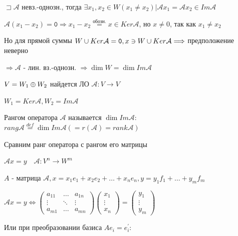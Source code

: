 \documentclass[12pt]{article}
\begin{document}
    $\sqsupset \mathcal{A}$ невз.-однозн., тогда $\displaystyle \exists x_1, x_2 \in W (x_1 \neq x_2) | \mathcal{A}x_1 = \mathcal{A}x_2 \in Im \mathcal{A}$

    $\displaystyle \mathcal{A}(x_1 - x_2) = \texttt{0} \Longrightarrow x_1 - x_2 \stackrel{\text{обозн.}}{=} x \in Ker \mathcal{A}$, но $x \neq 0$, так как $\displaystyle x_1 \neq x_2$

    Но для прямой суммы $W \cup Ker \mathcal{A} = \texttt{0}, x \ni W \cup Ker \mathcal{A} \Longrightarrow$ предположение неверно

    $\Longrightarrow \mathcal{A}$ - лин. вз.-однозн. $\Longrightarrow \dim W = \dim Im \mathcal{A}$

    $\displaystyle V = W_1 \oplus W_2$ найдется ЛО $\mathcal{A} : V \rightarrow V$

    $\displaystyle W_1 = Ker \mathcal{A}, W_2 = Im \mathcal{A}$

    \Def Рангом оператора $\mathcal{A}$ называется $\dim Im \mathcal{A}$: $rang \mathcal{A} \stackrel{def}{=} \dim Im \mathcal{A} (= r(\mathcal{A}) = rank \mathcal{A})$

    \Nota Сравним ранг оператора с рангом его матрицы

    $\displaystyle \mathcal{A} x = y \quad \mathcal{A} : V^n \rightarrow W^m$

    $A$ - матрица $\displaystyle \mathcal{A}, x = x_1 e_1 + x_2 e_2 + \dots + x_n e_n, y = y_1 f_1 + \dots + y_m f_m$

    $\displaystyle \mathcal{A}x = y \Longleftrightarrow \begin{pmatrix}
         a_{11} & \dots & a_{1n} \\
         \vdots & \ddots & \vdots \\
         a_{m1} & \dots & a_{mn}
    \end{pmatrix} \begin{pmatrix}
         x_1 \\
         \vdots \\
         x_n
    \end{pmatrix} = \begin{pmatrix}
         y_1 \\
         \vdots \\
         y_m
    \end{pmatrix}$

    Или при преобразовании базиса $\displaystyle Ae_i = e^\prime_i$:
\end{document}
